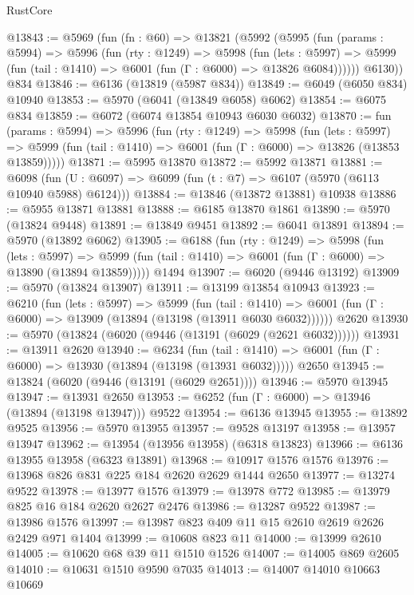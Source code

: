 \begin{lexlean}{RustCore}
\begin{coremodule}
{\begin{coremodule}
{{{{{{{{{{{{{{{{{{{{{{{{{{{{{{{{{{{{{{{{{{{{{@13843 := @5969
    (fun (fn : @60) =>
    @13821
      (@5992
        (@5995
          (fun (params : @5994) =>
          @5996
            (fun (rty : @1249) =>
            @5998
              (fun (lets : @5997) =>
              @5999 (fun (tail : @1410) => @6001 (fun (Γ : @6000) => @13826 @6084))))))
        @6130))
    @834
@13846 := @6136 (@13819 (@5987 @834))
@13849 := @6049 (@6050 @834) @10940
@13853 := @5970 (@6041 (@13849 @6058) @6062)
@13854 := @6075 @834
@13859 := @6072 (@6074 @13854 @10943 @6030 @6032)
@13870 := fun (params : @5994) =>
  @5996
    (fun (rty : @1249) =>
    @5998
      (fun (lets : @5997) =>
      @5999 (fun (tail : @1410) => @6001 (fun (Γ : @6000) => @13826 (@13853 @13859)))))
@13871 := @5995 @13870
@13872 := @5992 @13871
@13881 := @6098
    (fun (U : @6097) => @6099 (fun (t : @7) => @6107 (@5970 (@6113 @10940 @5988) @6124)))
@13884 := @13846 (@13872 @13881) @10938
@13886 := @5955 @13871 @13881
@13888 := @6185 @13870 @1861
@13890 := @5970 (@13824 @9448)
@13891 := @13849 @9451
@13892 := @6041 @13891
@13894 := @5970 (@13892 @6062)
@13905 := @6188
    (fun (rty : @1249) =>
    @5998
      (fun (lets : @5997) =>
      @5999 (fun (tail : @1410) => @6001 (fun (Γ : @6000) => @13890 (@13894 @13859)))))
    @1494
@13907 := @6020 (@9446 @13192)
@13909 := @5970 (@13824 @13907)
@13911 := @13199 @13854 @10943
@13923 := @6210
    (fun (lets : @5997) =>
    @5999
      (fun (tail : @1410) =>
      @6001 (fun (Γ : @6000) => @13909 (@13894 (@13198 (@13911 @6030 @6032))))))
    @2620
@13930 := @5970 (@13824 (@6020 (@9446 (@13191 (@6029 (@2621 @6032))))))
@13931 := @13911 @2620
@13940 := @6234
    (fun (tail : @1410) => @6001 (fun (Γ : @6000) => @13930 (@13894 (@13198 (@13931 @6032)))))
    @2650
@13945 := @13824 (@6020 (@9446 (@13191 (@6029 @2651))))
@13946 := @5970 @13945
@13947 := @13931 @2650
@13953 := @6252 (fun (Γ : @6000) => @13946 (@13894 (@13198 @13947))) @9522
@13954 := @6136 @13945
@13955 := @13892 @9525
@13956 := @5970 @13955
@13957 := @9528 @13197
@13958 := @13957 @13947
@13962 := @13954 (@13956 @13958) (@6318 @13823)
@13966 := @6136 @13955 @13958 (@6323 @13891)
@13968 := @10917 @1576 @1576
@13976 := @13968 @826 @831 @225 @184 @2620 @2629 @1444 @2650
@13977 := @13274 @9522
@13978 := @13977 @1576
@13979 := @13978 @772
@13985 := @13979 @825 @16 @184 @2620 @2627 @2476
@13986 := @13287 @9522
@13987 := @13986 @1576
@13997 := @13987 @823 @409 @11 @15 @2610 @2619 @2626 @2429 @971 @1404
@13999 := @10608 @823 @11
@14000 := @13999 @2610
@14005 := @10620 @68 @39 @11 @1510 @1526
@14007 := @14005 @869 @2605
@14010 := @10631 @1510 @9590 @7035
@14013 := @14007 @14010 @10663 @10669
}}}}}}}}}}}}}}}}}}}}}}}}}}}}}}}}}}}}}}}}}}}}}
\end{coremodule}}
\end{coremodule}
\end{lexlean}
